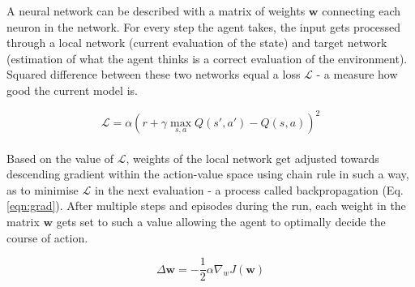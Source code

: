 \documentclass{article}
\begin{document}
A neural network can be described with a matrix of weights $\textbf{w}$ connecting each neuron in the network. For every step the agent takes, the input gets processed through a local network (current evaluation of the state) and target network (estimation of what the agent thinks is a correct evaluation of the environment). Squared difference between these two networks equal a loss $\mathcal{L}$ - a measure how good the current model is.

\begin{equation}
    \label{eqn:loss}
    \mathcal{L} = \alpha(r+\gamma\max_{s,a} Q(s',a')-Q(s,a))^2
\end{equation}
\\
Based on the value of $\mathcal{L}$, weights of the local network get adjusted towards descending gradient within the action-value space using chain rule in such a way, as to minimise $\mathcal{L}$ in the next evaluation - a process called backpropagation (Eq. \ref{eqn:grad}). After multiple steps and episodes during the run, each weight in the matrix $\textbf{w}$ gets set to such a value allowing the agent to optimally decide the course of action.

\begin{equation}
    \label{eqn:grad}
    \Delta\textbf{w}=-\frac{1}{2}\alpha\nabla_{w}J(\textbf{w})
\end{equation}
\end{document}
